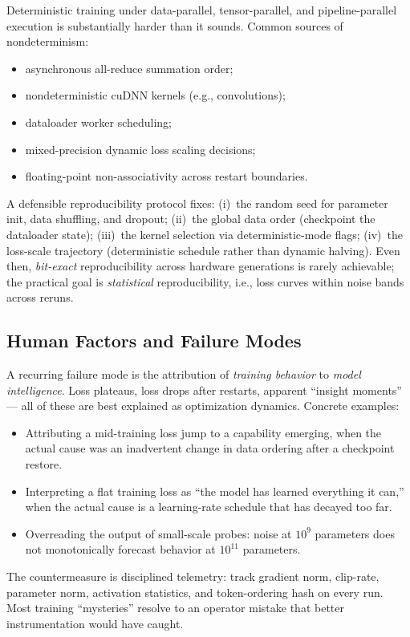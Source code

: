 Deterministic training under data-parallel, tensor-parallel, and
pipeline-parallel execution is substantially harder than it sounds.
Common sources of nondeterminism:
\begin{itemize}
  \item asynchronous all-reduce summation order;
  \item nondeterministic cuDNN kernels (e.g., convolutions);
  \item dataloader worker scheduling;
  \item mixed-precision dynamic loss scaling decisions;
  \item floating-point non-associativity across restart boundaries.
\end{itemize}
A defensible reproducibility protocol fixes:
(i)~the random seed for parameter init, data shuffling, and dropout;
(ii)~the global data order (checkpoint the dataloader state);
(iii)~the kernel selection via deterministic-mode flags;
(iv)~the loss-scale trajectory (deterministic schedule rather than
dynamic halving).
Even then, \emph{bit-exact} reproducibility across hardware generations
is rarely achievable; the practical goal is \emph{statistical}
reproducibility, i.e., loss curves within noise bands across reruns.

\subsection{Human Factors and Failure Modes}

A recurring failure mode is the attribution of \emph{training behavior}
to \emph{model intelligence}. Loss plateaus, loss drops after restarts,
apparent ``insight moments'' — all of these are best explained as
optimization dynamics. Concrete examples:
\begin{itemize}
  \item Attributing a mid-training loss jump to a capability emerging,
        when the actual cause was an inadvertent change in data
        ordering after a checkpoint restore.
  \item Interpreting a flat training loss as ``the model has learned
        everything it can,'' when the actual cause is a learning-rate
        schedule that has decayed too far.
  \item Overreading the output of small-scale probes: noise at
        $10^9$ parameters does not monotonically forecast behavior at
        $10^{11}$ parameters.
\end{itemize}
The countermeasure is disciplined telemetry: track gradient norm,
clip-rate, parameter norm, activation statistics, and token-ordering
hash on every run. Most training ``mysteries'' resolve to an operator
mistake that better instrumentation would have caught.

